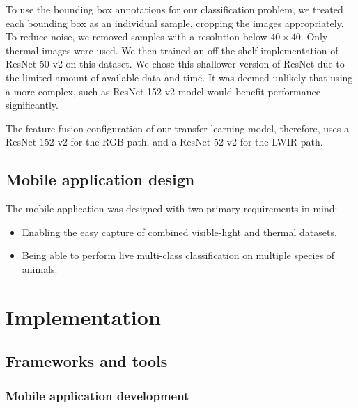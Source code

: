 \documentclass{l4proj}
\begin{document}
To use the bounding box annotations for our classification problem, we treated each bounding box as an individual sample, cropping the images appropriately. To reduce noise, we removed samples with a resolution below $40 \times 40$. Only thermal images were used. We then trained an off-the-shelf implementation of ResNet 50 v2 on this dataset. We chose this shallower version of ResNet due to the limited amount of available data and time. It was deemed unlikely that using a more complex, such as ResNet 152 v2 model would benefit performance significantly.

The feature fusion configuration of our transfer learning model, therefore, uses a ResNet 152 v2 for the RGB path, and a ResNet 52 v2 for the LWIR path.


\section{Mobile application design}

The mobile application was designed with two primary requirements in mind:

\begin{itemize}
  \item Enabling the easy capture of combined visible-light and thermal datasets.
  \item Being able to perform live multi-class classification on multiple species of animals.
\end{itemize}



\chapter{Implementation}
\label{implementation}

\section{Frameworks and tools}

\subsection{Mobile application development}
\end{document}
